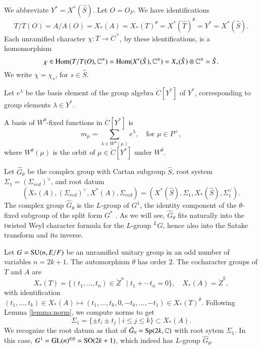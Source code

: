 We abbreviate $Y^* = X^*(\hat S)$. Let $O=O_F$.
We have identifications
\begin{equation}\label{eqn:identify}
T/T(O)=A/A(O)=X_*(A)=X_*(T)^\theta  =X^*(\hat T)^\theta = Y^* = X^*(\hat S).
\end{equation}
Each unramified character $\chi:T\to \ring{C}^\times$, by these identifications, is a homomorphism
\begin{equation}
\chi\in{\operatorname{Hom}}(T/T(O),\mathbb{C}^\times) = {\operatorname{Hom}}(X^*(\hat S),\mathbb{C}^\times) = X_*(\hat S)\otimes \mathbb{C}^\times = \hat S.
\end{equation}
We write $\chi = \chi_s$, for $s\in\hat S$.

Let $e^\lambda$ be the basis element of  the group algebra $\ring{C}[Y^*]$ of $Y^*$, 
 corresponding to group elements $\lambda\in Y^*$.

A basis of $W^\theta$-fixed functions in $\ring{C}[Y^*]$ is 
\[
m_\mu = \sum_{\lambda\in W^\theta(\mu)} e^\lambda, \quad \text{for }\mu\in P^+,
\]
where $W^\theta(\mu)$ is the orbit of $\mu\in\ring{C}[Y^*]$ under $W^\theta$.




Let $\hat G_\theta$ be the complex group with
 Cartan subgroup $\hat S$, root system 
$\Sigma_1=(\Sigma_{red})^\vee$, and root datum
\[
(X_*(A),(\Sigma_{red})^\vee,X^*(A),\Sigma_{red}) = (X^*(\hat S),\Sigma_1,X_*(\hat S),\Sigma_1^\vee).
\]
The complex group $\hat G_\theta$ is the $L$-group of $G^1$, the identity component of the
$\theta$-fixed subgroup of the split form $G^*$ \cite[\S1.3]{kottwitz1999foundations}.
As we will see, $\hat G_\theta$ fits naturally
into the twisted Weyl character formula for the $L$-group ${}^LG$, hence also into the Satake transform
and its inverse.  

\begin{example}  Let $G={\operatorname{SU}}(n,E/F)$ be an unramified unitary group in an odd number of variables $n=2k+1$.
The automorphism $\theta$ has order $2$.
The cocharacter groups of $T$ and $A$ are
\[
X_*(T) = \{(t_1,\ldots,t_{n})\in \ring{Z}^n\mid t_1+\cdots t_n=0\}, 
\quad
X_*(A)  = \ring{Z}^k,
\]
with identification $(t_1,\ldots,t_k)\in X_*(A)\mapsto (t_1,\ldots,t_k,0,-t_k,\ldots,-t_1)\in X_*(T)^\theta$.
Following Lemma \ref{lemma:norm}, we compute norms to get
\[
\Sigma_1 = \{\pm t_i\pm t_j\mid i\le j\le k\}\subset X_*(A).
\]
We recognize the root datum as that of $\hat G_\theta = {\operatorname{Sp}}(2k,\mathbb{C})$ with root sytem $\Sigma_1$.  
In this case, $G^1 = {\operatorname{GL}}(n)^{\theta,0} = {\operatorname{SO}}(2k+1)$, which indeed has $L$-group $\hat G_\theta$.
\end{example}




